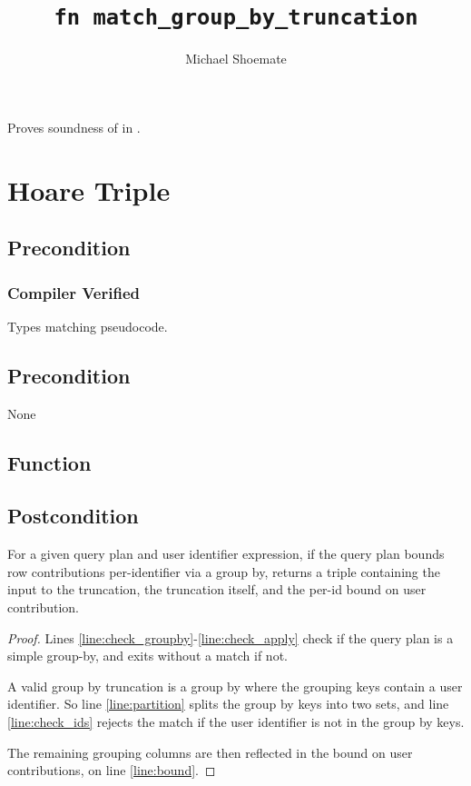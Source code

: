 \documentclass{article}
\title{\texttt{fn match\_group\_by\_truncation}}
\author{Michael Shoemate}
\begin{document}
\maketitle  


\contrib

Proves soundness of  
in .

\section{Hoare Triple}
\subsection*{Precondition}
\subsubsection*{Compiler Verified}
Types matching pseudocode.

\subsection*{Precondition}
None 

\subsection*{Function}
\label{sec:python-pseudocode}


\subsection*{Postcondition}
\begin{theorem}[Postcondition]
    For a given query plan and user identifier expression,
    if the query plan bounds row contributions per-identifier via a group by,
    returns a triple containing the input to the truncation, 
    the truncation itself, and the per-id bound on user contribution.
\end{theorem}

\begin{proof}
    Lines \ref{line:check_groupby}-\ref{line:check_apply} check if the query plan is a simple group-by,
    and exits without a match if not.

    A valid group by truncation is a group by where the grouping keys contain a user identifier.
    So line \ref{line:partition} splits the group by keys into two sets, 
    and line \ref{line:check_ids} rejects the match if the user identifier is not in the group by keys.

    The remaining grouping columns are then reflected in the bound on user contributions,
    on line \ref{line:bound}.
\end{proof}
\end{document}
